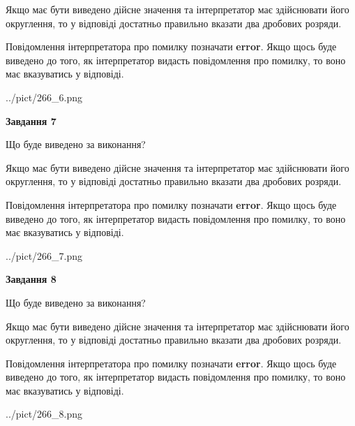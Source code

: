 \documentclass[12pt, ukrainian]{article}
\begin{document}
{\begin {Large}
Якщо має бути виведено дійсне значення та інтерпретатор має здійснювати його округлення, 
то у відповіді достатньо правильно вказати два дробових розряди.

Повідомлення інтерпретатора про помилку позначати \textbf{error}.
Якщо щось буде виведено до того, як інтерпретатор видасть повідомлення про помилку, 
то воно має вказуватись у відповіді. \par

\begin{center}
	{../pict/266_6.png}
\end{center}
\newpage

{\begin {center}\textbf{Завдання 7}\end {center}}\par
Що буде виведено за виконання? \par

Якщо має бути виведено дійсне значення та інтерпретатор має здійснювати його округлення, 
то у відповіді достатньо правильно вказати два дробових розряди.

Повідомлення інтерпретатора про помилку позначати \textbf{error}.
Якщо щось буде виведено до того, як інтерпретатор видасть повідомлення про помилку, 
то воно має вказуватись у відповіді. \par

\begin{center}
	{../pict/266_7.png}
\end{center}
\newpage

{\begin {center}\textbf{Завдання 8}\end {center}}\par
Що буде виведено за виконання? \par

Якщо має бути виведено дійсне значення та інтерпретатор має здійснювати його округлення, 
то у відповіді достатньо правильно вказати два дробових розряди.

Повідомлення інтерпретатора про помилку позначати \textbf{error}.
Якщо щось буде виведено до того, як інтерпретатор видасть повідомлення про помилку, 
то воно має вказуватись у відповіді. \par

\begin{center}
	{../pict/266_8.png}
\end{center}
\newpage


\end{Large}}
\end{document}
